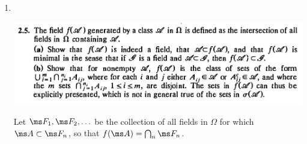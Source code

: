 \begin{enumerate}
\begin{enumerate}[label=(\alph*)]
\begin{proof}
      define $\ms F_n = \sigma(\ms A_n)$, the $\sigma$-algebra generated by $\ms F_n$. Then for example we have
      \begin{align*}
        \ms F_1 &= \Big\{\emptyset,
                         (0, .5], (.5, 1],
                         (0, 1]
                   \Big\} \\
      \end{align*}
      Note however that $(1 - 2^{-n}, 1] \in \ms F_n$ and that $\bigcap_{n=1}^\infty (1 - 2^{-n}, 1] = \{1\}$.
      Therefore if $\bigcup_{n=1}^\infty \ms F_n$ is a $\sigma$-algebra
      then $\{1\} \in \bigcup_{n=1}^\infty \ms F_n$.

      But $\{1\}$ is not a dyadic interval, therefore there is no $n$ for which $\{1\} \in \ms A_n$.
      Furthermore there is no $n$ for which $\{1\} \in \sigma(\ms A_n)$ (justification below).

      Therefore $\{1\} \notin \bigcup_{n=1}^\infty \ms F_n$ and so $\bigcup_{n=1}^\infty \ms F_n$ is not a $\sigma$-algebra.

      ~\\
      \textbf{Justification that there is no $n$ for which $\{1\} \in \sigma(\ms A_n)$:}

      By definition, $\sigma(\ms A_n)$ is the intersection of all $\sigma$-algebras that include $\ms A_n$.
      Suppose $\{1\} \in \sigma(\ms A_n)$. Now form a new class of sets $\sigma^*(\ms A_n)$ by removing
      from $\sigma(\ms A_n)$ every set that contains $1$ as an isolated point, and its complement. We claim
      that $\sigma^*(\ms A_n)$ is a $\sigma$-algebra. Note that none of the removed sets were in $\ms A_n$
      (since they are not dyadic intervals). But
      then $\ms A_n \subseteq \sigma^*(\ms A_n) \subset \sigma(\ms A_n)$ which contradicts the definition
      of $\sigma(\ms A_n)$. Therefore $\{1\} \notin \sigma(\ms A_n)$.
    \end{proof}
  \end{enumerate}

\newpage
\item~\\
  \begin{mdframed}
    \includegraphics[width=400pt]{img/analysis--berkeley-202a-hw-ab18.png}
  \end{mdframed}
  Let $\ms F_1, \ms F_2, \ldots$ be the collection of all fields in $\Omega$ for which $\ms A \subset \ms F_n$,
  so that $f(\ms A) = \bigcap_{n}\ms F_n$.


\end{enumerate}

